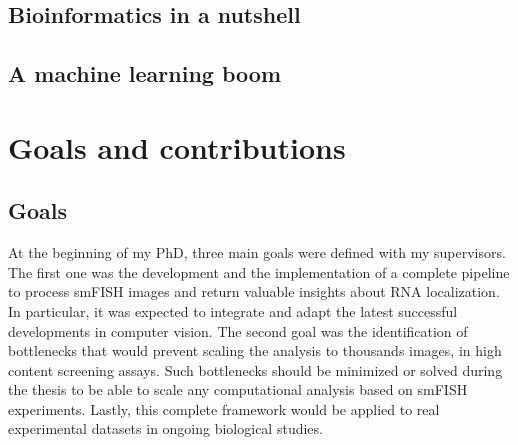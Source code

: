 \subsection{Bioinformatics in a nutshell}
\label{subsec:intro_non_ml_tools}

\subsection{A machine learning boom}
\label{subsec:intro_ml_tools}


\section{Goals and contributions}
\label{sec:contributions}

\subsection{Goals}
\label{subsec:intro_goals}

At the beginning of my PhD, three main goals were defined with my supervisors.
The first one was the development and the implementation of a complete pipeline to process \ac{smFISH} images and return valuable insights about \ac{RNA} localization.
In particular, it was expected to integrate and adapt the latest successful developments in computer vision.
The second goal was the identification of bottlenecks that would prevent scaling the analysis to thousands images, in high content screening assays.
Such bottlenecks should be minimized or solved during the thesis to be able to scale any computational analysis based on \ac{smFISH} experiments.
Lastly, this complete framework would be applied to real experimental datasets in ongoing biological studies.


